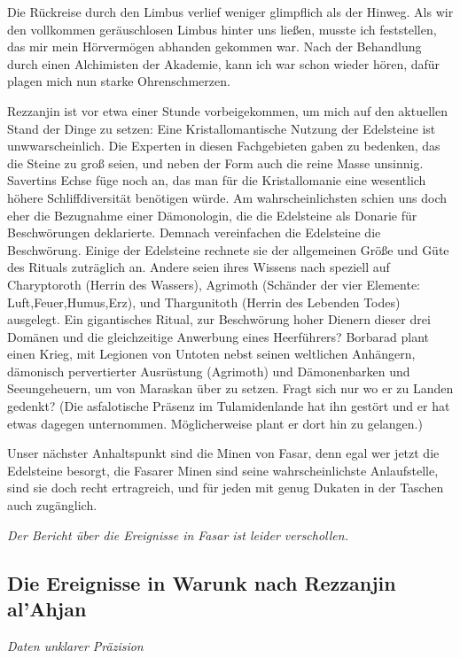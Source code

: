 Die Rückreise durch den Limbus verlief weniger glimpflich als der Hinweg. Als wir den vollkommen geräuschlosen Limbus hinter uns ließen, musste ich feststellen, das mir mein Hörvermögen abhanden gekommen war. Nach der Behandlung durch einen Alchimisten der Akademie, kann ich war schon wieder hören, dafür plagen mich nun starke Ohrenschmerzen.

Rezzanjin ist vor etwa einer Stunde vorbeigekommen, um mich auf den aktuellen Stand der Dinge zu setzen:
Eine Kristallomantische Nutzung der Edelsteine ist unwwarscheinlich. Die Experten in diesen Fachgebieten gaben zu bedenken, das die Steine zu groß seien, und neben der Form auch die reine Masse unsinnig. Savertins Echse füge noch an, das man für die Kristallomanie eine wesentlich höhere Schliffdiversität benötigen würde.
Am wahrscheinlichsten schien uns doch eher die Bezugnahme einer Dämonologin, die die Edelsteine als Donarie für Beschwörungen deklarierte.
Demnach vereinfachen die Edelsteine die Beschwörung. Einige der Edelsteine rechnete sie der allgemeinen Größe und Güte des Rituals zuträglich an. Andere seien ihres Wissens nach speziell auf Charyptoroth (Herrin des Wassers), Agrimoth (Schänder der vier Elemente: Luft,Feuer,Humus,Erz), und Thargunitoth (Herrin des Lebenden Todes) ausgelegt. Ein gigantisches Ritual, zur Beschwörung hoher Dienern dieser drei Domänen und die gleichzeitige Anwerbung eines Heerführers? Borbarad plant einen Krieg, mit Legionen von Untoten nebst seinen weltlichen Anhängern, dämonisch pervertierter Ausrüstung (Agrimoth) und Dämonenbarken und Seeungeheuern, um von Maraskan über zu setzen. Fragt sich nur wo er zu Landen gedenkt? (Die asfalotische Präsenz im Tulamidenlande hat ihn gestört und er hat etwas dagegen unternommen. Möglicherweise plant er dort hin zu gelangen.)

Unser nächster Anhaltspunkt sind die Minen von Fasar, denn egal wer jetzt die Edelsteine besorgt, die Fasarer Minen sind seine wahrscheinlichste Anlaufstelle, sind sie doch recht ertragreich, und für jeden mit genug Dukaten in der Taschen auch zugänglich.

\emph{Der Bericht über die Ereignisse in Fasar ist leider verschollen.}

\subsection{Die Ereignisse in Warunk nach Rezzanjin al'Ahjan}

\emph{Daten unklarer Präzision}

